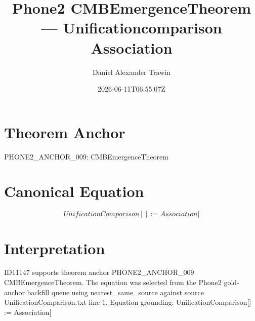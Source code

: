 \documentclass[11pt]{article}
\title{Phone2 CMBEmergenceTheorem — Unificationcomparison Association}
\author{Daniel Alexander Trawin}
\date{2026-06-11T06:55:07Z}
\begin{document}
\maketitle
\section*{Theorem Anchor}
PHONE2_ANCHOR_009: CMBEmergenceTheorem
\section*{Canonical Equation}
\[
UnificationComparison[] := Association[
\]
\section*{Interpretation}
ID11147 supports theorem anchor PHONE2_ANCHOR_009 CMBEmergenceTheorem. The equation was selected from the Phone2 gold-anchor backfill queue using nearest_same_source against source UnificationComparison.txt line 1. Equation grounding: UnificationComparison[] := Association[
\end{document}
